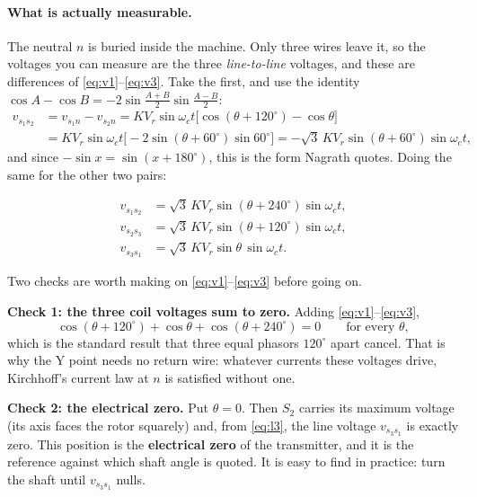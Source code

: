 \documentclass[11pt,a4paper]{article}
\begin{document}
\paragraph{What is actually measurable.} The neutral $n$ is buried inside the
machine. Only three wires leave it, so the voltages you can measure are the
three \emph{line-to-line} voltages, and these are differences of
\eqref{eq:v1}--\eqref{eq:v3}. Take the first, and use the identity
$\cos A-\cos B=-2\sin\frac{A+B}{2}\sin\frac{A-B}{2}$:
\begin{align*}
  v_{s_{1}s_{2}}&=v_{s_{1}n}-v_{s_{2}n}
   =KV_{r}\sin\omega_{c}t\big[\cos(\theta+120^\circ)-\cos\theta\big]\\
  &=KV_{r}\sin\omega_{c}t\big[-2\sin(\theta+60^\circ)\sin 60^\circ\big]
   =-\sqrt{3}\,KV_{r}\sin(\theta+60^\circ)\sin\omega_{c}t,
\end{align*}
and since $-\sin x=\sin(x+180^\circ)$, this is the form Nagrath quotes. Doing
the same for the other two pairs:

\begin{align}
  v_{s_{1}s_{2}}&=\sqrt{3}\,KV_{r}\sin(\theta+240^\circ)\sin\omega_{c}t, \label{eq:l1}\\
  v_{s_{2}s_{3}}&=\sqrt{3}\,KV_{r}\sin(\theta+120^\circ)\sin\omega_{c}t, \label{eq:l2}\\
  v_{s_{3}s_{1}}&=\sqrt{3}\,KV_{r}\sin\theta\,\sin\omega_{c}t.           \label{eq:l3}
\end{align}

Two checks are worth making on \eqref{eq:v1}--\eqref{eq:v3} before going on.

\smallskip
\textbf{Check 1: the three coil voltages sum to zero.} Adding
\eqref{eq:v1}--\eqref{eq:v3},
\[
  \cos(\theta+120^\circ)+\cos\theta+\cos(\theta+240^\circ)=0
  \qquad\text{for every }\theta,
\]
which is the standard result that three equal phasors $120^\circ$ apart
cancel. That is why the Y point needs no return wire: whatever currents these
voltages drive, Kirchhoff's current law at $n$ is satisfied without one.

\smallskip
\textbf{Check 2: the electrical zero.} Put $\theta=0$. Then $S_{2}$ carries
its maximum voltage (its axis faces the rotor squarely) and, from
\eqref{eq:l3}, the line voltage $v_{s_{3}s_{1}}$ is exactly zero. This
position is the \textbf{electrical zero} of the transmitter, and it is the
reference against which shaft angle is quoted. It is easy to find in practice:
turn the shaft until $v_{s_{3}s_{1}}$ nulls.
\end{document}
